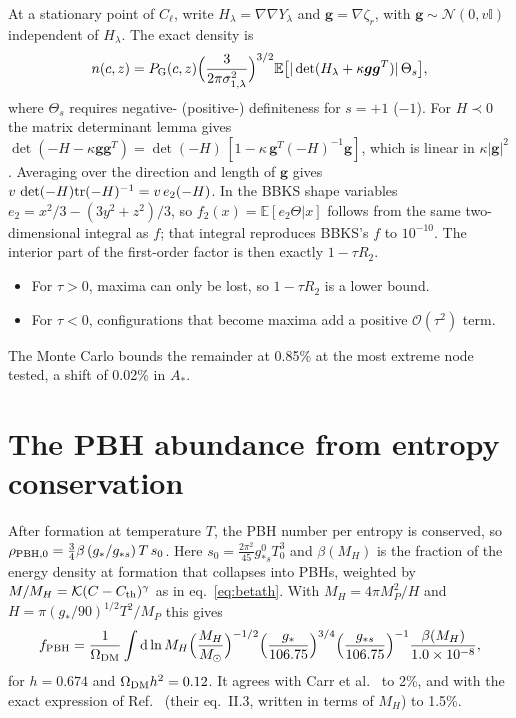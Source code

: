 \documentclass[11pt,a4paper]{article}
\newcommand{\Cl}{C_{\ell}}
\newcommand{\zr}{\zeta_r}
\newcommand{\dd}{\mathrm{d}}
\newcommand{\E}{\mathbb{E}}
\newcommand{\fpbh}{f_{\rm PBH}}
\newcommand{\Mo}{M_\odot}
\begin{document}
At a stationary point of $\Cl$, write $H_\lambda=\nabla\nabla Y_\lambda$ and $\bm g=\nabla\zr$, with
$\bm g\sim\mathcal N(0,v\mathbb I)$ independent of $H_\lambda$. The exact density is
\begin{equation}
n(c,z)=P_{\rm G}(c,z)\Big(\frac{3}{2\pi\sigma^2_{1,\lambda}}\Big)^{3/2}
\E\big[|\det(H_\lambda+\kappa\bm g\bm g^T)|\,\Theta_s\big],
\end{equation}
where $\Theta_s$ requires negative- (positive-) definiteness for $s=+1$ ($-1$). For $H\prec0$ the
matrix determinant lemma gives
$\det(-H-\kappa\bm g\bm g^T)=\det(-H)\,[1-\kappa\,\bm g^T(-H)^{-1}\bm g]$, which is linear in
$\kappa|\bm g|^2$. Averaging over the direction and length of $\bm g$ gives
$v\,\det(-H){\rm tr}(-H)^{-1}=v\,e_2(-H)$. In the BBKS shape variables
$e_2=x^2/3-(3y^2+z^2)/3$, so $f_2(x)=\E[e_2\Theta|x]$ follows from the same two-dimensional
integral as $f$; that integral reproduces BBKS's $f$ to $10^{-10}$. The interior part of the
first-order factor is then exactly $1-\tau R_2$.
\begin{itemize}
\item For $\tau>0$, maxima can only be lost, so $1-\tau R_2$ is a lower bound.
\item For $\tau<0$, configurations that become maxima add a positive $\mathcal O(\tau^2)$ term.
\end{itemize}
The Monte Carlo bounds the remainder at 0.85\% at the most extreme node tested, a shift of
0.02\% in $A_*$.

\section{The PBH abundance from entropy conservation}\label{app:fpbh}

After formation at temperature $T$, the PBH number per entropy is conserved, so
$\rho_{\rm PBH,0}=\frac34\beta\,(g_*/g_{*s})\,T\,s_0$. Here $s_0=\frac{2\pi^2}{45}g_{*s}^0T_0^3$ and
$\beta(M_H)$ is the fraction of the energy density at formation that collapses into PBHs, weighted by
$M/M_H=\mathcal K(C-C_{\rm th})^\gamma$ as in eq.~\eqref{eq:betath}. With
$M_H=4\pi M_P^2/H$ and $H=\pi(g_*/90)^{1/2}T^2/M_P$ this gives
\begin{equation}
\fpbh=\frac{1}{\Omega_{\rm DM}}\int\dd\ln M_H\Big(\frac{M_H}{\Mo}\Big)^{-1/2}
\Big(\frac{g_*}{106.75}\Big)^{3/4}\Big(\frac{g_{*s}}{106.75}\Big)^{-1}\frac{\beta(M_H)}{1.0\times10^{-8}},
\end{equation}
for $h=0.674$ and $\Omega_{\rm DM}h^2=0.12$. It agrees with Carr et al.\ \cite{Carr10} to 2\%, and
with the exact expression of Ref.~\cite{CK20} (their eq.~II.3, written in terms of $M_H$) to
1.5\%.
\end{document}
